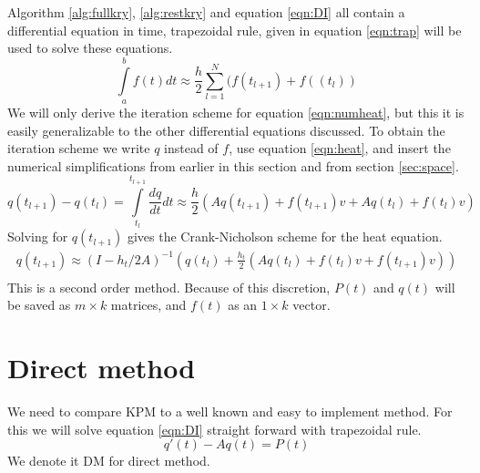 Algorithm \ref{alg:fullkry}, \ref{alg:restkry} and equation \ref{eqn:DI} all contain a differential equation in time,
trapezoidal rule\cite{trap}, given in equation \eqref{eqn:trap} will be used to solve these equations. 
\begin{equation} \label{eqn:trap}
\int \limits_a^b f(t) dt \approx \frac{h}{2} \sum \limits_{l = 1}^N(f(t_{l+1})+f((t_l))
\end{equation}
We will only derive the iteration scheme for equation \eqref{eqn:numheat}, but 
this it is easily generalizable to the other differential equations discussed.
To obtain the iteration scheme we write $q$ instead of $f$, use equation \eqref{eqn:heat}, and insert the numerical simplifications from earlier in this section and from section \ref{sec:space}.
\begin{equation}
q(t_{l+1}) - q(t_l) = \int \limits_{t_l}^{t_{l+1}} \frac{d q}{d t} dt \approx \frac{h}{2}(A q(t_{l+1})+f(t_{l+1})v +A q(t_l)+f(t_l) v) 
\end{equation}
Solving for $q(t_{l+1})$ gives the Crank-Nicholson scheme for the heat equation.
\begin{equation} \label{eqn:trapscheme}
\begin{aligned}
q(t_{l+1}) \approx (I-h_t/2 A)^{-1}(q(t_l) + \frac{h_t}{2}( A q(t_{l}) + f(t_l)v+f(t_{l+1})v))\\
\end{aligned}
\end{equation} 
This is a second order method.
Because of this discretion, $P(t)$ and $q(t)$ will be saved as $m \times k $ matrices, and $f(t)$ as an $1 \times k$ vector.
\section{Direct method} \label{sec:DM}
We need to compare KPM to a well known and easy to implement method. For this we will solve equation \eqref{eqn:DI} straight forward with trapezoidal rule.
\begin{equation} \label{eqn:DI}
q'(t) -A q(t) = P(t)
\end{equation}
We denote it DM for direct method.
